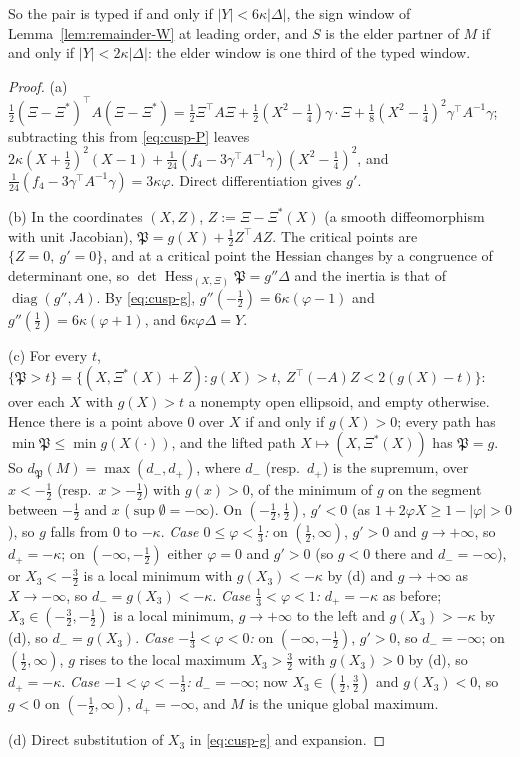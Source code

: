 So the pair is typed if and only if $|Y|<6\kappa|\Delta|$, the sign window of Lemma~\ref{lem:remainder-W} at leading order, and $S$ is the elder partner of $M$ if and only if $|Y|<2\kappa|\Delta|$: the elder window is one third of the typed window.

\begin{proof}
(a) $\frac12(\Xi-\Xi^*)^{\top}A(\Xi-\Xi^*)=\frac12\Xi^{\top}A\Xi+\frac12(X^2-\frac14)\gamma\cdot\Xi+\frac18(X^2-\frac14)^2\gamma^{\top}A^{-1}\gamma$; subtracting this from \eqref{eq:cusp-P} leaves $2\kappa(X+\frac12)^2(X-1)+\frac1{24}(f_4-3\gamma^{\top}A^{-1}\gamma)(X^2-\frac14)^2$, and $\frac1{24}(f_4-3\gamma^{\top}A^{-1}\gamma)=3\kappa\varphi$. Direct differentiation gives $g'$.

(b) In the coordinates $(X,Z)$, $Z:=\Xi-\Xi^*(X)$ (a smooth diffeomorphism with unit Jacobian), $\mathfrak P=g(X)+\frac12Z^{\top}AZ$. The critical points are $\{Z=0,\ g'=0\}$, and at a critical point the Hessian changes by a congruence of determinant one, so $\det\operatorname{Hess}_{(X,\Xi)}\mathfrak P=g''\Delta$ and the inertia is that of $\operatorname{diag}(g'',A)$. By \eqref{eq:cusp-g}, $g''(-\frac12)=6\kappa(\varphi-1)$ and $g''(\frac12)=6\kappa(\varphi+1)$, and $6\kappa\varphi\Delta=Y$.

(c) For every $t$, $\{\mathfrak P>t\}=\{(X,\Xi^*(X)+Z):g(X)>t,\ Z^{\top}(-A)Z<2(g(X)-t)\}$: over each $X$ with $g(X)>t$ a nonempty open ellipsoid, and empty otherwise. Hence there is a point above $0$ over $X$ if and only if $g(X)>0$; every path has $\min\mathfrak P\le\min g(X(\cdot))$, and the lifted path $X\mapsto(X,\Xi^*(X))$ has $\mathfrak P=g$. So $d_{\mathfrak P}(M)=\max(d_-,d_+)$, where $d_-$ (resp.\ $d_+$) is the supremum, over $x<-\frac12$ (resp.\ $x>-\frac12$) with $g(x)>0$, of the minimum of $g$ on the segment between $-\frac12$ and $x$ ($\sup\emptyset=-\infty$). On $(-\frac12,\frac12)$, $g'<0$ (as $1+2\varphi X\ge1-|\varphi|>0$), so $g$ falls from $0$ to $-\kappa$.
\emph{Case $0\le\varphi<\frac13$:} on $(\frac12,\infty)$, $g'>0$ and $g\to+\infty$, so $d_+=-\kappa$; on $(-\infty,-\frac12)$ either $\varphi=0$ and $g'>0$ (so $g<0$ there and $d_-=-\infty$), or $X_3<-\frac32$ is a local minimum with $g(X_3)<-\kappa$ by (d) and $g\to+\infty$ as $X\to-\infty$, so $d_-=g(X_3)<-\kappa$.
\emph{Case $\frac13<\varphi<1$:} $d_+=-\kappa$ as before; $X_3\in(-\frac32,-\frac12)$ is a local minimum, $g\to+\infty$ to the left and $g(X_3)>-\kappa$ by (d), so $d_-=g(X_3)$.
\emph{Case $-\frac13<\varphi<0$:} on $(-\infty,-\frac12)$, $g'>0$, so $d_-=-\infty$; on $(\frac12,\infty)$, $g$ rises to the local maximum $X_3>\frac32$ with $g(X_3)>0$ by (d), so $d_+=-\kappa$.
\emph{Case $-1<\varphi<-\frac13$:} $d_-=-\infty$; now $X_3\in(\frac12,\frac32)$ and $g(X_3)<0$, so $g<0$ on $(-\frac12,\infty)$, $d_+=-\infty$, and $M$ is the unique global maximum.

(d) Direct substitution of $X_3$ in \eqref{eq:cusp-g} and expansion.
\end{proof}

